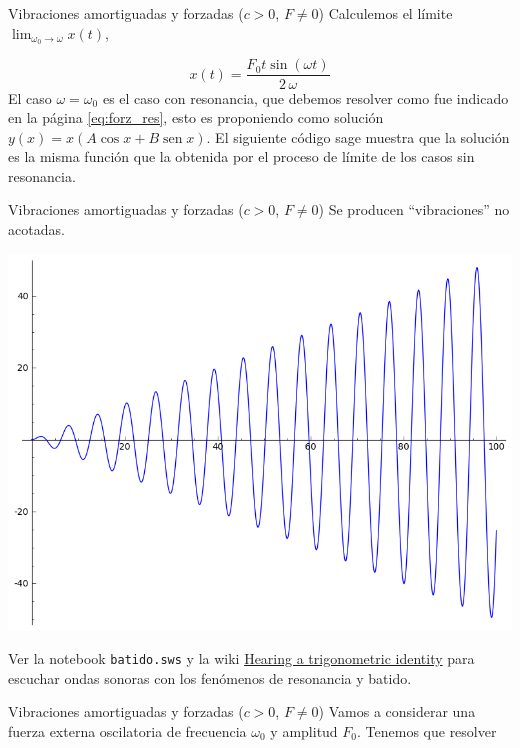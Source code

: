 \documentclass[handout,hyperref={colorlinks=true}]{beamer}
\DeclareMathOperator{\sen}{sen}
\begin{document}
\begin{frame}{ Vibraciones amortiguadas y forzadas ($c>0$, $F\neq 0$) }
Calculemos el límite $\lim_{\omega_0\to\omega}x(t)$,
\lstI

\[x(t)=\frac{F_{0} t \sin\left(\omega t\right)}{2 \, \omega}
\]
El caso $\omega=\omega_0$ es el caso con resonancia, que debemos resolver como fue indicado en la página \ref{eq:forz_res}, 
esto es proponiendo como solución $y(x)=x\left(A\cos x+ B\sen x\right)$. El siguiente código sage muestra que la solución es la misma función
que la obtenida por el proceso de límite de los casos sin resonancia.



\end{frame}

 \begin{frame}{ Vibraciones amortiguadas y forzadas ($c>0$, $F\neq 0$) } 
Se producen ``vibraciones'' no acotadas.
\begin{center}
 \includegraphics[scale=0.3]{imagenes/osc_arm_forz_res.png}
\end{center}

Ver la notebook \texttt{batido.sws} y la wiki \href{http://wiki.sagemath.org/interact/misc\#Hearing_a_trigonometric_identity}{Hearing a trigonometric identity}
para escuchar ondas sonoras con los fenómenos de resonancia y batido.

\end{frame}



\begin{frame}{ Vibraciones amortiguadas y forzadas ($c>0$, $F\neq 0$) }
Vamos a considerar una fuerza externa oscilatoria de frecuencia $\omega_0$ y amplitud $F_0$. Tenemos que resolver



\end{frame}
\end{document}
